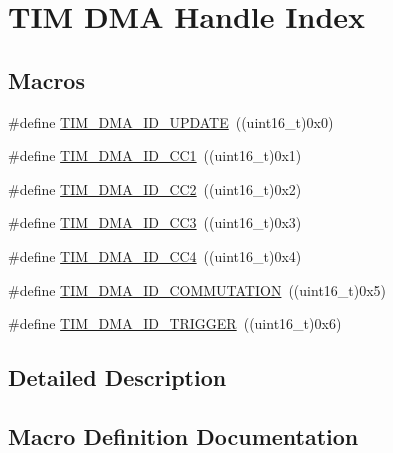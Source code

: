 \hypertarget{group___t_i_m___d_m_a___handle__index}{}\section{T\+IM D\+MA Handle Index}
\label{group___t_i_m___d_m_a___handle__index}
\subsection*{Macros}
\begin{DoxyCompactItemize}
\item 
\#define \hyperlink{group___t_i_m___d_m_a___handle__index_ga15f38cee11f8b2b5a85cbf4552ba140d}{T\+I\+M\+\_\+\+D\+M\+A\+\_\+\+I\+D\+\_\+\+U\+P\+D\+A\+TE}~((uint16\+\_\+t)0x0)
\item 
\#define \hyperlink{group___t_i_m___d_m_a___handle__index_ga7ca691eb5e29b0206d3390cc6e90079a}{T\+I\+M\+\_\+\+D\+M\+A\+\_\+\+I\+D\+\_\+\+C\+C1}~((uint16\+\_\+t)0x1)
\item 
\#define \hyperlink{group___t_i_m___d_m_a___handle__index_ga9c52f32d4bd21dd2d232900219f0a111}{T\+I\+M\+\_\+\+D\+M\+A\+\_\+\+I\+D\+\_\+\+C\+C2}~((uint16\+\_\+t)0x2)
\item 
\#define \hyperlink{group___t_i_m___d_m_a___handle__index_ga6e8145f305b54744bf2ef379a4315a40}{T\+I\+M\+\_\+\+D\+M\+A\+\_\+\+I\+D\+\_\+\+C\+C3}~((uint16\+\_\+t)0x3)
\item 
\#define \hyperlink{group___t_i_m___d_m_a___handle__index_ga1860c00b370435ff40d9e65f14a61706}{T\+I\+M\+\_\+\+D\+M\+A\+\_\+\+I\+D\+\_\+\+C\+C4}~((uint16\+\_\+t)0x4)
\item 
\#define \hyperlink{group___t_i_m___d_m_a___handle__index_gaa707c98bb11277665635ca7aef1e4193}{T\+I\+M\+\_\+\+D\+M\+A\+\_\+\+I\+D\+\_\+\+C\+O\+M\+M\+U\+T\+A\+T\+I\+ON}~((uint16\+\_\+t)0x5)
\item 
\#define \hyperlink{group___t_i_m___d_m_a___handle__index_ga39900e5227e4d813a726a1df5d86671c}{T\+I\+M\+\_\+\+D\+M\+A\+\_\+\+I\+D\+\_\+\+T\+R\+I\+G\+G\+ER}~((uint16\+\_\+t)0x6)
\end{DoxyCompactItemize}


\subsection{Detailed Description}


\subsection{Macro Definition Documentation}
\mbox{\label{group___t_i_m___d_m_a___handle__index_ga7ca691eb5e29b0206d3390cc6e90079a}} 
